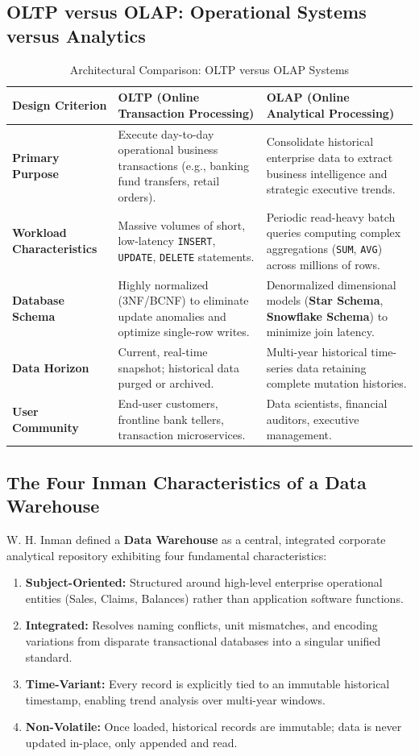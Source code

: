 \subsection{OLTP versus OLAP: Operational Systems versus Analytics}
\begin{table}[htbp]
\centering
\small
\caption{Architectural Comparison: OLTP versus OLAP Systems}
\label{tab:oltp_vs_olap}
\begin{tabularx}{\textwidth}{p{3.2cm} X X}
\toprule
\textbf{Design Criterion} & \textbf{OLTP (Online Transaction Processing)} & \textbf{OLAP (Online Analytical Processing)} \\
\midrule
\textbf{Primary Purpose} & Execute day-to-day operational business transactions (e.g., banking fund transfers, retail orders). & Consolidate historical enterprise data to extract business intelligence and strategic executive trends. \\
\textbf{Workload Characteristics} & Massive volumes of short, low-latency \texttt{INSERT}, \texttt{UPDATE}, \texttt{DELETE} statements. & Periodic read-heavy batch queries computing complex aggregations (\texttt{SUM}, \texttt{AVG}) across millions of rows. \\
\textbf{Database Schema} & Highly normalized (3NF/BCNF) to eliminate update anomalies and optimize single-row writes. & Denormalized dimensional models (\textbf{Star Schema}, \textbf{Snowflake Schema}) to minimize join latency. \\
\textbf{Data Horizon} & Current, real-time snapshot; historical data purged or archived. & Multi-year historical time-series data retaining complete mutation histories. \\
\textbf{User Community} & End-user customers, frontline bank tellers, transaction microservices. & Data scientists, financial auditors, executive management. \\
\bottomrule
\end{tabularx}
\end{table}

\subsection{The Four Inman Characteristics of a Data Warehouse}
W. H. Inman defined a \textbf{Data Warehouse} as a central, integrated corporate analytical repository exhibiting four fundamental characteristics:
\begin{enumerate}
    \item \textbf{Subject-Oriented:} Structured around high-level enterprise operational entities (Sales, Claims, Balances) rather than application software functions.
    \item \textbf{Integrated:} Resolves naming conflicts, unit mismatches, and encoding variations from disparate transactional databases into a singular unified standard.
    \item \textbf{Time-Variant:} Every record is explicitly tied to an immutable historical timestamp, enabling trend analysis over multi-year windows.
    \item \textbf{Non-Volatile:} Once loaded, historical records are immutable; data is never updated in-place, only appended and read.
\end{enumerate}

